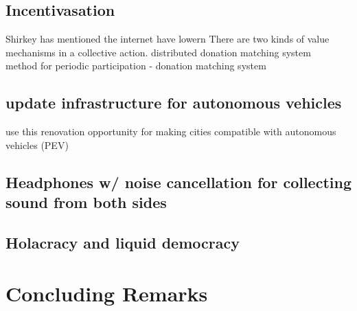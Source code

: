 \subsection{Incentivasation}
Shirkey has mentioned the internet have lowern There are two kinds of value mechanisms in a collective action. \cite{shirky2010cognitive}
distributed donation matching system \\
method for periodic participation - donation matching system \\
\subsection {update infrastructure for autonomous vehicles}
use this renovation opportunity for making cities compatible with autonomous vehicles (PEV)
\subsection{Headphones w/ noise cancellation for collecting sound from both
sides}
\subsection{Holacracy and liquid democracy}

\section{Concluding Remarks}
\cite{rudofsky1964architecture}


 